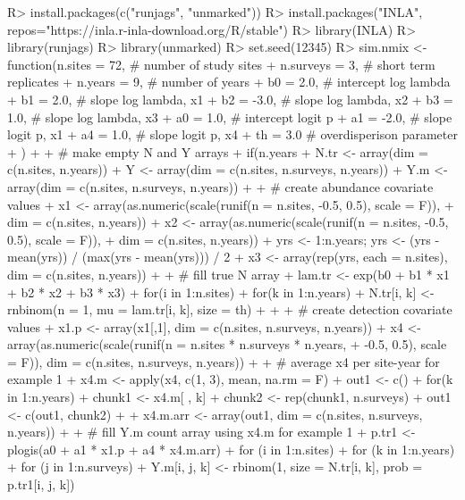 \documentclass[codesnippet]{jss}
\begin{document}
\begin{CodeInput}
R> install.packages(c("runjags", "unmarked"))
R> install.packages("INLA", repos="https://inla.r-inla-download.org/R/stable")
R> library(INLA)
R> library(runjags)
R> library(unmarked)
R> set.seed(12345)
R> sim.nmix <- function(n.sites = 72,    # number of study sites
+    n.surveys = 3,                      # short term replicates
+    n.years = 9,                        # number of years
+    b0 = 2.0,                           # intercept log lambda
+    b1 = 2.0,                           # slope log lambda, x1
+    b2 = -3.0,                          # slope log lambda, x2
+    b3 = 1.0,                           # slope log lambda, x3
+    a0 = 1.0,                           # intercept logit p
+    a1 = -2.0,                          # slope logit p, x1
+    a4 = 1.0,                           # slope logit p, x4
+    th = 3.0                            # overdisperison parameter
+    ){
+
+    # make empty N and Y arrays
+    if(n.years %
+    N.tr <- array(dim = c(n.sites, n.years))
+    Y <- array(dim = c(n.sites, n.surveys, n.years))
+    Y.m <- array(dim = c(n.sites, n.surveys, n.years))
+
+    # create abundance covariate values
+    x1 <- array(as.numeric(scale(runif(n = n.sites, -0.5, 0.5), scale = F)),
+      dim = c(n.sites, n.years))
+    x2 <- array(as.numeric(scale(runif(n = n.sites, -0.5, 0.5), scale = F)),
+      dim = c(n.sites, n.years))
+    yrs <- 1:n.years; yrs <- (yrs - mean(yrs)) / (max(yrs - mean(yrs))) / 2
+    x3 <- array(rep(yrs, each = n.sites), dim = c(n.sites, n.years))
+
+    # fill true N array
+    lam.tr <- exp(b0 + b1 * x1 + b2 * x2 + b3 * x3)
+    for(i in 1:n.sites){
+      for(k in 1:n.years){
+        N.tr[i, k] <- rnbinom(n = 1, mu = lam.tr[i, k], size = th)
+    }}
+
+    # create detection covariate values
+    x1.p <- array(x1[,1], dim = c(n.sites, n.surveys, n.years))
+    x4 <- array(as.numeric(scale(runif(n = n.sites * n.surveys * n.years,
+      -0.5, 0.5), scale = F)), dim = c(n.sites, n.surveys, n.years))
+
+    # average x4 per site-year for example 1
+    x4.m <- apply(x4, c(1, 3), mean, na.rm = F)
+    out1 <- c()
+    for(k in 1:n.years){
+      chunk1 <- x4.m[ , k]
+      chunk2 <- rep(chunk1, n.surveys)
+      out1 <- c(out1, chunk2)
+    }
+    x4.m.arr <- array(out1, dim = c(n.sites, n.surveys, n.years))
+
+    # fill Y.m count array using x4.m for example 1
+    p.tr1 <- plogis(a0 + a1 * x1.p + a4 * x4.m.arr)
+    for (i in 1:n.sites){
+      for (k in 1:n.years){
+        for (j in 1:n.surveys){
+          Y.m[i, j, k] <- rbinom(1, size = N.tr[i, k], prob = p.tr1[i, j, k])
}}}}
\end{CodeInput}
\end{document}
